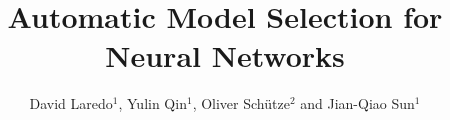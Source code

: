 \documentclass[12pt]{elsart}%
\begin{document}
\begin{frontmatter}

\title{Automatic Model Selection for Neural Networks}

\author{David Laredo$^{1}$, Yulin Qin$^{1}$, Oliver Sch\"utze$^{2}$ and Jian-Qiao Sun$^{1}$}
\address{
$^{1}$Department of Mechanical Engineering, School of Engineering\\
University of California, Merced, CA 95343, USA\\
$^{2}$Department of Computer Science, CINVESTAV, Mexico City, Mexico\\
and Rodolfo Quintero Chair, UAM Cuajimalpa, Mexico\\
Corresponding author: Jian-Qiao Sun. Email: jqsun@ucmerced.edu}


\end{frontmatter}
\end{document}

